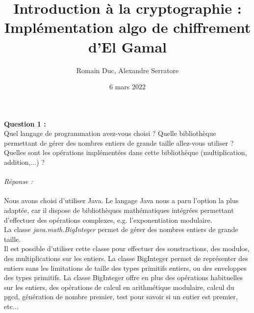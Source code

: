 \documentclass[a4paper,11pt]{article}
\title{Introduction à la cryptographie : Implémentation algo de chiffrement d'El Gamal}
\author{Romain Duc, Alexandre Serratore}
\date{6 mars 2022}
\begin{document}
	\maketitle
        \label{subsec:Q1}
        \textbf{Question 1 : \\}Quel langage de programmation avez-vous choisi ? Quelle bibliothèque permettant de gérer des nombres entiers de grande taille allez-vous utiliser ? Quelles sont les opérations implémentées dans cette bibliothèque (multiplication, addition,...) ?\\
		\textit{\\Réponse :} \\\\Nous avons choisi d'utiliser Java. Le langage Java nous a paru l'option la plus adaptée, car il dispose de bibliothèques mathématiques intégrées permettant d'effectuer des opérations complexes, e.g. l'exponentiation modulaire.\\La classe\textit{ java.math.BigInteger } permet de gérer des nombres entiers de grande taille. \\Il est possible d'utiliser cette classe pour effectuer des soustractions, des modulos, des multiplications sur les entiers. La classe BigInteger permet de représenter des entiers sans les limitations de taille des types primitifs entiers, ou des enveloppes des types primitifs. La classe BigInteger offre en plus des opérations habituelles sur les entiers, des opérations de calcul en arithmétique modulaire, calcul du pgcd, génération de nombre premier, test pour savoir si un entier est premier, etc...  \\\\
\end{document}
